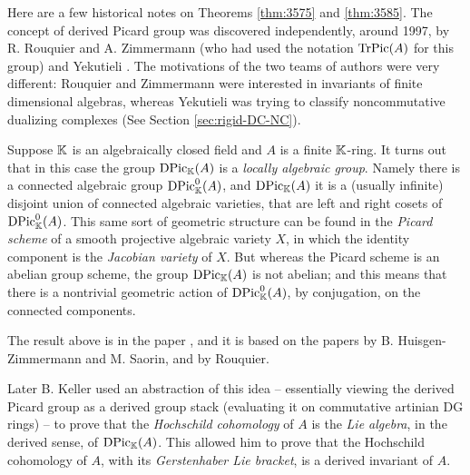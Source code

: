 \begin{rem} \label{rem:3430}
Here are a few historical notes on Theorems \ref{thm:3575} and  \ref{thm:3585}.
The concept of derived Picard group was discovered independently, around 
1997, by R. Rouquier and A. Zimmermann \cite{RoZi} (who had used the notation
$\operatorname{TrPic}(A)$ for this group) and Yekutieli \cite{Ye4}. The motivations of 
the two teams of authors were very different: Rouquier and Zimmermann were 
interested in invariants of finite dimensional algebras, whereas Yekutieli was 
trying to classify noncommutative dualizing complexes (See Section
\ref{sec:rigid-DC-NC}).
\end{rem}

\begin{rem} \label{rem:4650}
Suppose $\mathbb{K}$ is an algebraically closed field and $A$ is a finite $\mathbb{K}$-ring. 
It turns out that in this case the group $\operatorname{DPic}_{\mathbb{K}}(A)$ is a {\em locally 
algebraic group}. Namely there is a connected algebraic group 
$\operatorname{DPic}^0_{\mathbb{K}}(A)$, and $\operatorname{DPic}_{\mathbb{K}}(A)$ it is a (usually infinite) 
disjoint union of connected algebraic varieties, that are left and right cosets 
of  $\operatorname{DPic}^0_{\mathbb{K}}(A)$. This same sort of geometric structure can be found 
in the {\em Picard scheme} of a smooth projective algebraic variety $X$, in 
which the identity component is the {\em Jacobian variety} of $X$. But whereas 
the Picard scheme is an abelian group scheme, the group $\operatorname{DPic}_{\mathbb{K}}(A)$ is 
not 
abelian; and this means that there is a nontrivial geometric action of 
$\operatorname{DPic}^0_{\mathbb{K}}(A)$, by conjugation, on the connected components. 

The result above is in the paper \cite{Ye4.6}, and it is based on the papers 
\cite{HuSa} by B. Huisgen-Zimmermann and M. Saorin, and \cite{Rou} by Rouquier. 

Later B. Keller \cite{Kel3} used an abstraction of this idea -- essentially  
viewing the derived Picard group as a derived group stack (evaluating it on 
commutative artinian DG rings) -- to prove that the {\em Hochschild cohomology} 
of $A$ is the {\em Lie algebra}, in the derived sense, of $\operatorname{DPic}_{\mathbb{K}}(A)$. 
This allowed him to prove that the Hochschild cohomology of $A$, with its {\em 
Gerstenhaber Lie bracket}, is a derived invariant of $A$. 
\end{rem}






